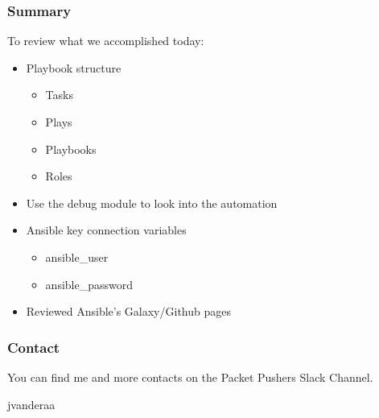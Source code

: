 \documentclass[aspectratio=169]{beamer}
\begin{document}
\begin{frame}
  \frametitle{Summary}
    To review what we accomplished today:
    \begin{itemize}
      \item <1-> Playbook structure
      \begin{itemize}
        \item <2-> Tasks
        \item <2-> Plays
        \item <2-> Playbooks
        \item <2-> Roles
      \end{itemize}
      \item <3-> Use the debug module to look into the automation
      \item <4-> Ansible key connection variables
      \begin{itemize}
        \item <5-> ansible\_user
        \item <5-> ansible\_password
      \end{itemize}
      \item <6-> Reviewed Ansible's Galaxy/Github pages
    \end{itemize}
\end{frame}

\begin{frame}
  \frametitle{Contact}
  \huge
  You can find me and more contacts on the Packet Pushers Slack Channel. 
  \linebreak
  \begin{center}
    \normalsize
    \faSlack \hspace{.1cm}jvanderaa  
  \end{center}
  
\end{frame}
\end{document}
